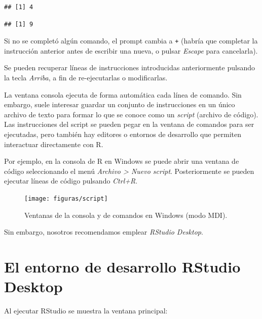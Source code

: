 \documentclass[
]{book}
\theoremstyle{break}
\theoremstyle{nonumberplain}
\begin{document}
\begin{verbatim}
## [1] 4
\end{verbatim}

\begin{verbatim}
## [1] 9
\end{verbatim}

Si no se completó algún comando, el prompt cambia a \texttt{+} (habría que completar la instrucción anterior antes de escribir una nueva, o pulsar \emph{Escape} para cancelarla).

Se pueden recuperar líneas de instrucciones introducidas anteriormente pulsando la tecla \emph{Arriba}, a fin de re-ejecutarlas o modificarlas.

La ventana consola ejecuta de forma automática cada línea de comando.
Sin embargo, suele interesar guardar un conjunto de instrucciones en un único archivo de texto para formar lo que se conoce como un \emph{script} (archivo de código).
Las instrucciones del script se pueden pegar en la ventana de comandos para ser ejecutadas, pero también hay editores o entornos de desarrollo que permiten interactuar directamente con R.

Por ejemplo, en la consola de R en Windows se puede abrir una ventana de código seleccionando el menú \emph{Archivo \textgreater{} Nuevo script}.
Posteriormente se pueden ejecutar líneas de código pulsando \emph{Ctrl+R}.

\begin{figure}[!htb]

{\centering \texttt{[image: figuras/script]} 

}

\caption{Ventanas de la consola y de comandos en Windows (modo MDI).}\label{fig:script}
\end{figure}

Sin embargo, nosotros recomendamos emplear \emph{RStudio Desktop}.

\hypertarget{rstudio}{%
\section{El entorno de desarrollo RStudio Desktop}\label{rstudio}}

Al ejecutar RStudio se muestra la ventana principal:
\end{document}
